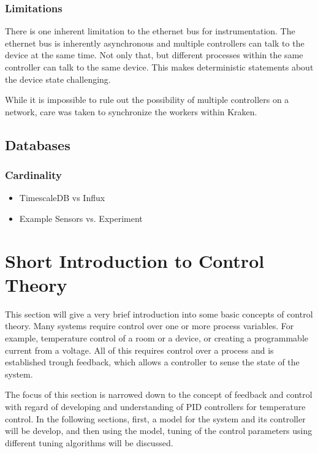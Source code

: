 \subsubsection{Limitations} %
There is one inherent limitation to the ethernet bus for instrumentation. The ethernet bus is inherently asynchronous and multiple controllers can talk to the device at the same time. Not only that, but different processes within the same controller can talk to the same device. This makes deterministic statements about the device state challenging.

While it is impossible to rule out the possibility of multiple controllers on a network, care was taken to synchronize the workers within Kraken.
\subsection{Databases}
\subsubsection{Cardinality}
\begin{itemize}
 \item TimescaleDB vs Influx
 \item Example Sensors vs. Experiment
\end{itemize}

\clearpage
\section{Short Introduction to Control Theory}
This section will give a very brief introduction into some basic concepts of control theory. Many systems require control over one or more process variables. For example, temperature control of a room or a device, or creating a programmable current from a voltage. All of this requires control over a process and is established trough feedback, which allows a controller to sense the state of the system.

The focus of this section is narrowed down to the concept of feedback and control with regard of developing and understanding of PID controllers for temperature control. In the following sections, first, a model for the system and its controller will be develop, and then using the model, tuning of the control parameters using different tuning algorithms will be discussed.

